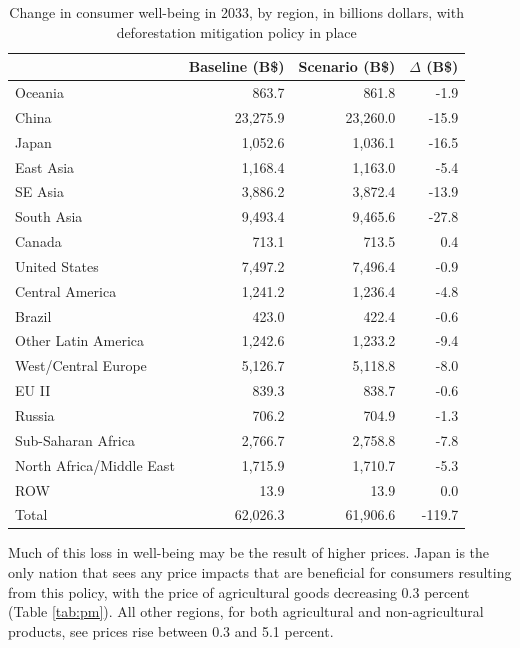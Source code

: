 \documentclass[
]{article}
\begin{document}
\begin{table}
\centering
\caption{\label{tab:EV}Change in consumer well-being in 2033, by region, in billions dollars, with deforestation mitigation policy in place}
\centering
\begin{tabular}[t]{|>{}l|r|r|>{}r|}
\hline
  & Baseline (B\$) & Scenario (B\$) & $\Delta$ (B\$)\\
\hline
Oceania & 863.7 & 861.8 & -1.9\\
\hline
China & 23,275.9 & 23,260.0 & -15.9\\
\hline
Japan & 1,052.6 & 1,036.1 & -16.5\\
\hline
East Asia & 1,168.4 & 1,163.0 & -5.4\\
\hline
SE Asia & 3,886.2 & 3,872.4 & -13.9\\
\hline
South Asia & 9,493.4 & 9,465.6 & -27.8\\
\hline
Canada & 713.1 & 713.5 & 0.4\\
\hline
United States & 7,497.2 & 7,496.4 & -0.9\\
\hline
Central America & 1,241.2 & 1,236.4 & -4.8\\
\hline
Brazil & 423.0 & 422.4 & -0.6\\
\hline
Other Latin America & 1,242.6 & 1,233.2 & -9.4\\
\hline
West/Central Europe & 5,126.7 & 5,118.8 & -8.0\\
\hline
EU II & 839.3 & 838.7 & -0.6\\
\hline
Russia & 706.2 & 704.9 & -1.3\\
\hline
Sub-Saharan Africa & 2,766.7 & 2,758.8 & -7.8\\
\hline
North Africa/Middle East & 1,715.9 & 1,710.7 & -5.3\\
\hline
ROW & 13.9 & 13.9 & 0.0\\
\hline
Total & 62,026.3 & 61,906.6 & -119.7\\
\hline
\end{tabular}
\end{table}

Much of this loss in well-being may be the result of higher prices. Japan is the only nation that sees any price impacts that are beneficial for consumers resulting from this policy, with the price of agricultural goods decreasing 0.3 percent (Table \ref{tab:pm}). All other regions, for both agricultural and non-agricultural products, see prices rise between 0.3 and 5.1 percent.
\end{document}
